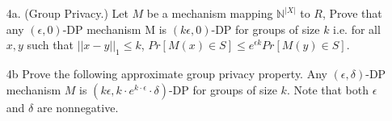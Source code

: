 \documentclass{article}
\begin{document}
\begin{itemize}
\item[4a.] (Group Privacy.)
Let $M$ be a mechanism mapping $\mathbb{N}^{|X|}$ to $R$,
Prove that any $(\epsilon,0)$-DP mechanism M is
$(k\epsilon,0)$-DP
for groups of size $k$ i.e. for all $x,y$ such that
$||x - y||_1 \leq k$,
$Pr[M(x) \in S] \leq e^{\epsilon k} Pr[M(y) \in S]$.

\item[4b] Prove the following approximate group
privacy property. Any $(\epsilon,\delta)$-DP mechanism $M$
is $(k\epsilon, k \cdot e^{k\cdot \epsilon} \cdot \delta)$-DP
for groups of size $k$. Note that both $\epsilon$ and $\delta$ are nonnegative.

\end{itemize}
\end{document}
